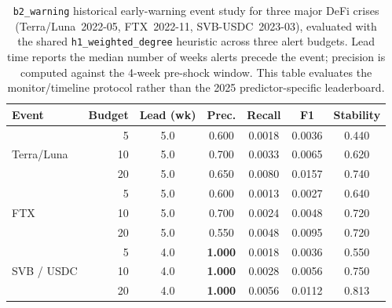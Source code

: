 \begin{table}[t]
\centering
\footnotesize
\setlength{\tabcolsep}{4pt}
\caption{\texttt{b2\_warning} historical early-warning event study for three
major DeFi crises (Terra/Luna~2022-05, FTX~2022-11, SVB-USDC~2023-03),
evaluated with the shared \texttt{h1\_weighted\_degree} heuristic across
three alert budgets. Lead time reports the median number of weeks alerts
precede the event; precision is computed against the 4-week pre-shock
window. This table evaluates the monitor/timeline protocol rather than the
2025 predictor-specific leaderboard.}
\label{tab:alert_timeline}
\begin{tabular}{l r c c c c c}
\toprule
Event & Budget & Lead (wk) & Prec. & Recall & F1 & Stability \\
\midrule
\multirow{3}{*}{Terra/Luna}
& 5  & 5.0 & 0.600 & 0.0018 & 0.0036 & 0.440 \\
& 10 & 5.0 & 0.700 & 0.0033 & 0.0065 & 0.620 \\
& 20 & 5.0 & 0.650 & 0.0080 & 0.0157 & 0.740 \\
\midrule
\multirow{3}{*}{FTX}
& 5  & 5.0 & 0.600 & 0.0013 & 0.0027 & 0.640 \\
& 10 & 5.0 & 0.700 & 0.0024 & 0.0048 & 0.720 \\
& 20 & 5.0 & 0.550 & 0.0048 & 0.0095 & 0.720 \\
\midrule
\multirow{3}{*}{SVB / USDC}
& 5  & 4.0 & \textbf{1.000} & 0.0018 & 0.0036 & 0.550 \\
& 10 & 4.0 & \textbf{1.000} & 0.0028 & 0.0056 & 0.750 \\
& 20 & 4.0 & \textbf{1.000} & 0.0056 & 0.0112 & 0.813 \\
\bottomrule
\end{tabular}
\end{table}
